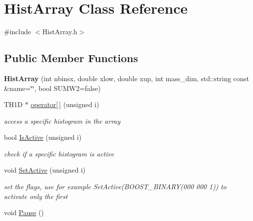 \hypertarget{classHistArray}{\section{Hist\-Array Class Reference}
\label{classHistArray}
}


{\ttfamily \#include $<$Hist\-Array.\-h$>$}

\subsection*{Public Member Functions}
\begin{DoxyCompactItemize}
\item 
\hypertarget{classHistArray_a15c4da658a89769a5a973a9eac939d57}{{\bfseries Hist\-Array} (int nbinsx, double xlow, double xup, int mass\-\_\-dim, std\-::string const \&name=\char`\"{}\char`\"{}, bool S\-U\-M\-W2=false)}\label{classHistArray_a15c4da658a89769a5a973a9eac939d57}

\item 
T\-H1\-D $\ast$ \hyperlink{classHistArray_abfd450684a3cfda8cb0231b450e1c3ec}{operator\mbox{[}$\,$\mbox{]}} (unsigned i)
\begin{DoxyCompactList}\small\item\em access a specific histogram in the array \end{DoxyCompactList}\item 
\hypertarget{classHistArray_ab324fc243624240fe661ab18529f70c3}{bool \hyperlink{classHistArray_ab324fc243624240fe661ab18529f70c3}{Is\-Active} (unsigned i)}\label{classHistArray_ab324fc243624240fe661ab18529f70c3}

\begin{DoxyCompactList}\small\item\em check if a specific histogram is active \end{DoxyCompactList}\item 
\hypertarget{classHistArray_a5a83ba3fc0f0e30e41175d8a06bc24c3}{void \hyperlink{classHistArray_a5a83ba3fc0f0e30e41175d8a06bc24c3}{Set\-Active} (unsigned i)}\label{classHistArray_a5a83ba3fc0f0e30e41175d8a06bc24c3}

\begin{DoxyCompactList}\small\item\em set the flags, use for example Set\-Active(\-B\-O\-O\-S\-T\-\_\-\-B\-I\-N\-A\-R\-Y(000 000 1)) to activate only the first \end{DoxyCompactList}\item 
\hypertarget{classHistArray_a27f9acb7029ec4c90b4476e5bc26037d}{void \hyperlink{classHistArray_a27f9acb7029ec4c90b4476e5bc26037d}{Pause} ()}\label{classHistArray_a27f9acb7029ec4c90b4476e5bc26037d}


\end{DoxyCompactItemize}
